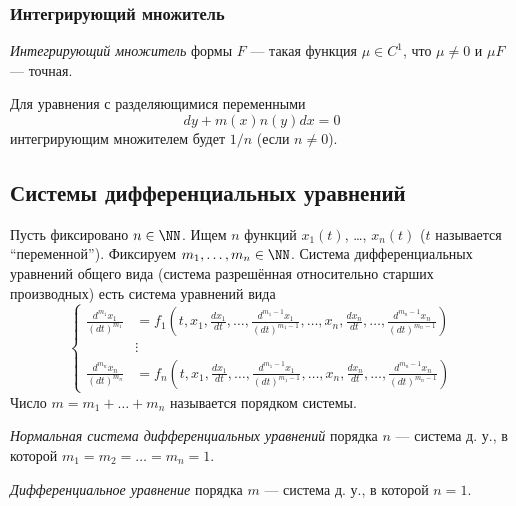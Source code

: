 \documentclass[12pt,a4paper]{article}
\begin{document}
    \subsubsection{Интегрирующий множитель}

    \begin{definition}
        \emph{Интегрирующий множитель} формы $F$ --- такая функция $\mu \in C^1$, что $\mu \neq 0$ и $\mu F$ --- точная.
    \end{definition}

    \begin{example}
        Для уравнения с разделяющимися переменными
        \[dy + m(x) n(y) dx = 0\]
        интегрирующим множителем будет $1/n$ (если $n \neq 0$).
    \end{example}

    \subsection{Системы дифференциальных уравнений}

    \begin{definition}
        Пусть фиксировано $n \in \NN$. Ищем $n$ функций $x_1(t)$, \dots, $x_n(t)$ ($t$ называется ``переменной''). Фиксируем $m_1, \dots, m_n \in \NN$. Система дифференциальных уравнений общего вида (система разрешённая относительно старших производных) есть система уравнений вида
        \[
            \left\{
                \begin{aligned}
                    \frac{d^{m_1}x_1}{(dt)^{m_1}} &= f_1\left(t, x_1, \frac{d x_1}{dt}, \dots, \frac{d^{m_1-1}x_1}{(dt)^{m_1-1}}, \dots, x_n, \frac{d x_n}{dt}, \dots, \frac{d^{m_n-1}x_n}{(dt)^{m_n-1}}\right)\\
                    &\vdots\\
                    \frac{d^{m_n}x_n}{(dt)^{m_n}} &= f_n\left(t, x_1, \frac{d x_1}{dt}, \dots, \frac{d^{m_1-1}x_1}{(dt)^{m_1-1}}, \dots, x_n, \frac{d x_n}{dt}, \dots, \frac{d^{m_n-1}x_n}{(dt)^{m_n-1}}\right)
                \end{aligned}
            \right.
        \]
        Число $m = m_1 + \dots + m_n$ называется порядком системы.

        \emph{Нормальная система дифференциальных уравнений} порядка $n$ --- система д. у., в которой $m_1 = m_2 = \dots = m_n = 1$.

        \emph{Дифференциальное уравнение} порядка $m$ --- система д. у., в которой $n = 1$.
    \end{definition}
\end{document}
